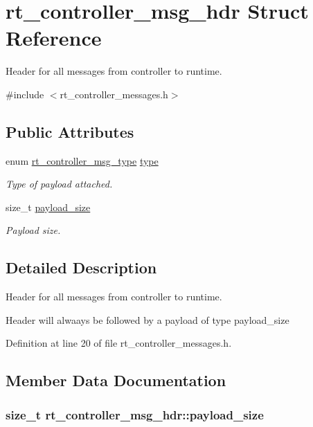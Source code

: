 \hypertarget{structrt__controller__msg__hdr}{\section{rt\-\_\-controller\-\_\-msg\-\_\-hdr Struct Reference}
\label{structrt__controller__msg__hdr}
}


Header for all messages from controller to runtime.  




{\ttfamily \#include $<$rt\-\_\-controller\-\_\-messages.\-h$>$}

\subsection*{Public Attributes}
\begin{DoxyCompactItemize}
\item 
enum \hyperlink{rt__controller__messages_8h_ab990cb7ec49a837b83bdb51c50903aeb}{rt\-\_\-controller\-\_\-msg\-\_\-type} \hyperlink{structrt__controller__msg__hdr_aeaaded0407c30884b04405eae9ecc9f3}{type}
\begin{DoxyCompactList}\small\item\em Type of payload attached. \end{DoxyCompactList}\item 
size\-\_\-t \hyperlink{structrt__controller__msg__hdr_adfd4a8c90b69662216de245f2d05b4b3}{payload\-\_\-size}
\begin{DoxyCompactList}\small\item\em Payload size. \end{DoxyCompactList}\end{DoxyCompactItemize}


\subsection{Detailed Description}
Header for all messages from controller to runtime. 

Header will alwaays be followed by a payload of type {\ttfamily payload\-\_\-size} 

Definition at line 20 of file rt\-\_\-controller\-\_\-messages.\-h.



\subsection{Member Data Documentation}
\hypertarget{structrt__controller__msg__hdr_adfd4a8c90b69662216de245f2d05b4b3}{
\subsubsection[{payload\-\_\-size}]{\setlength{\rightskip}{0pt plus 5cm}size\-\_\-t rt\-\_\-controller\-\_\-msg\-\_\-hdr\-::payload\-\_\-size}}\label{structrt__controller__msg__hdr_adfd4a8c90b69662216de245f2d05b4b3}


